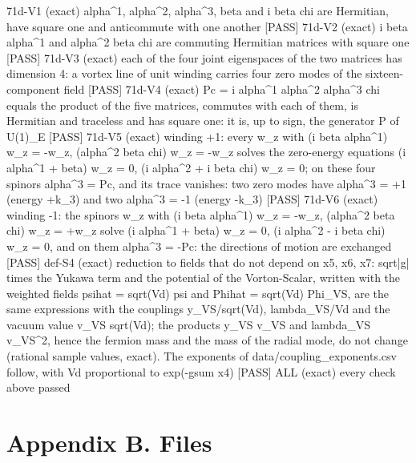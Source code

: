 \documentclass[
  10pt,
]{article}
\newenvironment{Shaded}{}{}
\newcommand{\NormalTok}[1]{#1}
\begin{document}
\begin{Shaded}
\begin{Highlighting}[]
\NormalTok{[PASS] 71d{-}V1  (exact) alpha\^{}1, alpha\^{}2, alpha\^{}3, beta and i beta chi are Hermitian, have square one and anticommute with one another}
\NormalTok{[PASS] 71d{-}V2  (exact) i beta alpha\^{}1 and alpha\^{}2 beta chi are commuting Hermitian matrices with square one}
\NormalTok{[PASS] 71d{-}V3  (exact) each of the four joint eigenspaces of the two matrices has dimension 4: a vortex line of unit winding carries four zero modes of the sixteen{-}component field}
\NormalTok{[PASS] 71d{-}V4  (exact) Pc = i alpha\^{}1 alpha\^{}2 alpha\^{}3 chi equals the product of the five matrices, commutes with each of them, is Hermitian and traceless and has square one: it is, up to sign, the generator P of U(1)\_E}
\NormalTok{[PASS] 71d{-}V5  (exact) winding +1: every w\_z with (i beta alpha\^{}1) w\_z = {-}w\_z, (alpha\^{}2 beta chi) w\_z = {-}w\_z solves the zero{-}energy equations (i alpha\^{}1 + beta) w\_z = 0, (i alpha\^{}2 + i beta chi) w\_z = 0; on these four spinors alpha\^{}3 = Pc, and its trace vanishes: two zero modes have alpha\^{}3 = +1 (energy +k\_3) and two alpha\^{}3 = {-}1 (energy {-}k\_3)}
\NormalTok{[PASS] 71d{-}V6  (exact) winding {-}1: the spinors w\_z with (i beta alpha\^{}1) w\_z = {-}w\_z, (alpha\^{}2 beta chi) w\_z = +w\_z solve (i alpha\^{}1 + beta) w\_z = 0, (i alpha\^{}2 {-} i beta chi) w\_z = 0, and on them alpha\^{}3 = {-}Pc: the directions of motion are exchanged}
\NormalTok{[PASS] def{-}S4  (exact) reduction to fields that do not depend on x5, x6, x7: sqrt|g| times the Yukawa term and the potential of the Vorton{-}Scalar, written with the weighted fields psihat = sqrt(Vd) psi and Phihat = sqrt(Vd) Phi\_VS, are the same expressions with the couplings y\_VS/sqrt(Vd), lambda\_VS/Vd and the vacuum value v\_VS sqrt(Vd); the products y\_VS v\_VS and lambda\_VS v\_VS\^{}2, hence the fermion mass and the mass of the radial mode, do not change (rational sample values, exact). The exponents of data/coupling\_exponents.csv follow, with Vd proportional to exp({-}gsum x4)}
\NormalTok{[PASS] ALL  (exact) every check above passed}
\end{Highlighting}
\end{Shaded}

\hypertarget{appendix-b.-files}{%
\section{Appendix B. Files}\label{appendix-b.-files}}
\end{document}
